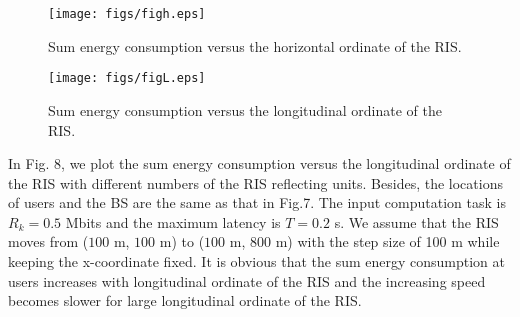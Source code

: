 \documentclass[journal]{IEEEtran}
\begin{document}
\begin{figure}[htb]
	\centering
	\texttt{[image: figs/figh.eps]}
	\vspace{-1.5em}
    \caption{ Sum energy consumption versus the horizontal ordinate of the RIS.}\label{fig_6}
	\vspace{-.5em}
\end{figure}
\begin{figure}[htb]
	\centering
	\texttt{[image: figs/figL.eps]}
	\vspace{-1.5em}
	\caption{ Sum energy consumption versus the longitudinal ordinate of the RIS.}\label{fig_7}
	\vspace{-.5em}
\end{figure}

{In Fig. 8, we plot the sum energy consumption versus the longitudinal ordinate of the RIS with different numbers of the RIS reflecting units. Besides, the locations of users and the BS are the same as that in Fig.7. The input computation task is $R_k=0.5$ Mbits and the maximum latency is $T=0.2$ s. We assume that the RIS moves from ($100$ m, $100$ m) to ($100$ m, $800$ m) with the step size of 100 m while keeping the x-coordinate fixed. It is obvious that the sum energy consumption at users increases with longitudinal ordinate of the RIS and the increasing speed becomes slower for large longitudinal ordinate of the RIS.}
%
%
%
%
\end{document}
